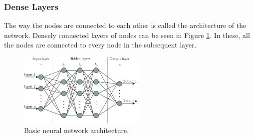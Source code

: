 \documentclass[10pt]{article}
\begin{document}
\subsubsection{Dense Layers}
The way the nodes are connected to each other is called the architecture of the network. Densely connected layers of nodes can be seen in Figure \ref{fig:densenet}. In these, all the nodes are connected to every node in the subsequent layer.
\begin{figure}[H]
	\centering
	\includegraphics[width=6cm]{resources/densenet.png}
	\caption{Basic neural network architecture\cite{bre2018prediction}.}
	\label{fig:densenet}
\end{figure}
\end{document}
